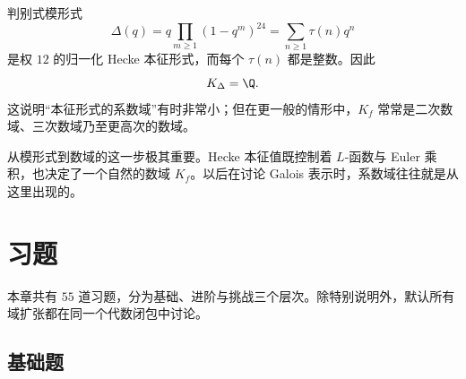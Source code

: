 \begin{example}
判别式模形式
\[
\Delta(q)=q\prod_{m\ge1}(1-q^m)^{24}=\sum_{n\ge1}\tau(n)q^n
\]
是权 $12$ 的归一化 Hecke 本征形式，而每个 $\tau(n)$ 都是整数。因此
\[
K_\Delta=\Q.
\]
这说明“本征形式的系数域”有时非常小；但在更一般的情形中，$K_f$ 常常是二次数域、三次数域乃至更高次的数域。
\end{example}

\begin{remark}
从模形式到数域的这一步极其重要。Hecke 本征值既控制着 $L$-函数与 Euler 乘积，也决定了一个自然的数域 $K_f$。以后在讨论 Galois 表示时，系数域往往就是从这里出现的。
\end{remark}

\section*{习题}

本章共有 $55$ 道习题，分为基础、进阶与挑战三个层次。除特别说明外，默认所有域扩张都在同一个代数闭包中讨论。

\subsection*{基础题}

